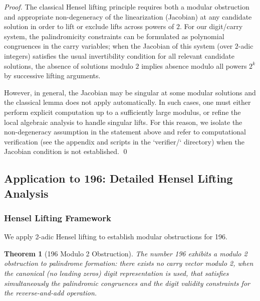 \documentclass[12pt,a4paper]{article}
\newtheorem{theorem}{Theorem}[section]
\begin{document}
\begin{proof}
The classical Hensel lifting principle requires both a modular obstruction and appropriate non-degeneracy of the linearization (Jacobian) at any candidate solution in order to lift or exclude lifts across powers of $2$. For our digit/carry system, the palindromicity constraints can be formulated as polynomial congruences in the carry variables; when the Jacobian of this system (over $2$-adic integers) satisfies the usual invertibility condition for all relevant candidate solutions, the absence of solutions modulo $2$ implies absence modulo all powers $2^k$ by successive lifting arguments.

However, in general, the Jacobian may be singular at some modular solutions and the classical lemma does not apply automatically. In such cases, one must either perform explicit computation up to a sufficiently large modulus, or refine the local algebraic analysis to handle singular lifts. For this reason, we isolate the non-degeneracy assumption in the statement above and refer to computational verification (see the appendix and scripts in the `verifier/` directory) when the Jacobian condition is not established.
\qed
\end{proof}

\subsection{Application to 196: Detailed Hensel Lifting Analysis}

\subsubsection{Hensel Lifting Framework}

We apply 2-adic Hensel lifting to establish modular obstructions for 196.

\begin{theorem}[196 Modulo 2 Obstruction]\label{thm:196_hensel-8}
The number 196 exhibits a modulo 2 obstruction to palindrome formation: there exists no carry vector modulo 2, when the canonical (no leading zeros) digit representation is used, that satisfies simultaneously the palindromic congruences and the digit validity constraints for the reverse-and-add operation.
\end{theorem}
\end{document}
